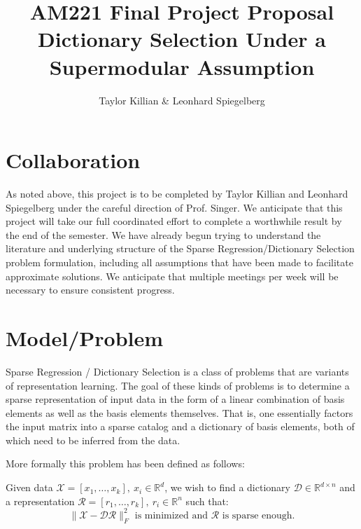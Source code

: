 \documentclass{article}
\newcommand{\R}{\mathbb{R}}
\begin{document}
\title{AM221 Final Project Proposal \\ \large Dictionary Selection Under a Supermodular Assumption}
\author{Taylor Killian \& Leonhard Spiegelberg}
\maketitle

%

\section{Collaboration}\label{partnership}
As noted above, this project is to be completed by Taylor Killian and Leonhard Spiegelberg under the careful direction of Prof. Singer. We anticipate that this project will take our full coordinated effort to complete a worthwhile result by the end of the semester. We have already begun trying to understand the literature and underlying structure of the Sparse Regression/Dictionary Selection problem formulation, including all assumptions that have been made to facilitate approximate solutions. We anticipate that multiple meetings per week will be necessary to ensure consistent progress. 

\section{Model/Problem} \label{model}
Sparse Regression / Dictionary Selection is a class of problems that are variants of representation learning. The goal of these kinds of problems is to determine a sparse representation of input data in the form of a linear combination of basis elements as well as the basis elements themselves. That is, one essentially factors the input matrix into a sparse catalog and a dictionary of basis elements, both of which need to be inferred from the data.
\newline

\noindent More formally this problem has been defined as follows:
\newline

Given data $\mathcal{X} = [x_1,\dots , x_k], \ x_i\in\R^d$, we wish to find a dictionary $\mathcal{D}\in\R^{d \times n}$ and a representation $\mathcal{R} = [r_1, \dots, r_k], \ r_i\in\R^n$ such that: $$\|\mathcal{X}-\mathcal{D}\mathcal{R}\|_F^2 \text{ is minimized and } \mathcal{R} \text{ is sparse enough.}$$
\end{document}
